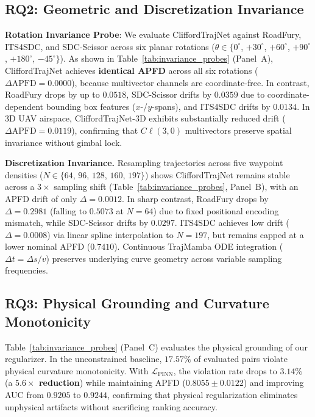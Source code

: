 \subsection{RQ2: Geometric and Discretization Invariance}

\textbf{Rotation Invariance Probe}:
We evaluate CliffordTrajNet against RoadFury, ITS4SDC, and SDC-Scissor across six planar rotations ($\theta \in \{0^\circ$, $+30^\circ$, $+60^\circ$, $+90^\circ$, $+180^\circ$, $-45^\circ\}$).
As shown in Table~\ref{tab:invariance_probes} (Panel~A), CliffordTrajNet achieves \textbf{identical APFD} across all six rotations ($\Delta\mathrm{APFD} = \mathbf{0.0000}$), because multivector channels are coordinate-free.
In contrast, RoadFury drops by up to $0.0518$, SDC-Scissor drifts by $0.0359$ due to coordinate-dependent bounding box features ($x$-/$y$-spans), and ITS4SDC drifts by $0.0134$.
In 3D UAV airspace, CliffordTrajNet-3D exhibits substantially reduced drift ($\Delta\mathrm{APFD} = \mathbf{0.0119}$), confirming that $C\ell(3,0)$ multivectors preserve spatial invariance without gimbal lock.

\textbf{Discretization Invariance.}
Resampling trajectories across five waypoint densities ($N \in \{64$, $96$, $128$, $160$, $197\}$) shows CliffordTrajNet remains stable across a $3\times$ sampling shift (Table~\ref{tab:invariance_probes}, Panel~B), with an APFD drift of only $\Delta = \mathbf{0.0012}$.
In sharp contrast, RoadFury drops by $\Delta = \mathbf{0.2981}$ (falling to $0.5073$ at $N=64$) due to fixed positional encoding mismatch, while SDC-Scissor drifts by $0.0297$. ITS4SDC achieves low drift ($\Delta=0.0008$) via linear spline interpolation to $N=197$, but remains capped at a lower nominal APFD ($0.7410$).
Continuous TrajMamba ODE integration ($\Delta t = \Delta s / v$) preserves underlying curve geometry across variable sampling frequencies.

\enlargethispage{5.5\baselineskip}
\subsection{RQ3: Physical Grounding and Curvature Monotonicity}

Table~\ref{tab:invariance_probes} (Panel~C) evaluates the physical grounding of our regularizer.
In the unconstrained baseline, $17.57\%$ of evaluated pairs violate physical curvature monotonicity.
With $\mathcal{L}_{\mathrm{PINN}}$, the violation rate drops to \textbf{$3.14\%$} (a \textbf{$5.6\times$ reduction}) while maintaining APFD ($0.8055 \pm 0.0122$) and improving AUC from $0.9205$ to $0.9244$, confirming that physical regularization eliminates unphysical artifacts without sacrificing ranking accuracy.

